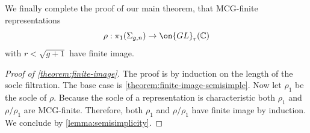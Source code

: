 \subsection{}
\label{subsection:main-proof}
We finally complete the proof of our main theorem, that
MCG-finite representations $$\rho: \pi_1(\Sigma_{g,n})\to
\on{GL}_r(\mathbb{C})$$ with $r<\sqrt{g+1}$ have finite image.
\begin{proof}[Proof of \autoref{theorem:finite-image}]
The proof is by induction on the length of the socle filtration. The base case is \autoref{theorem:finite-image-semisimple}. Now let $\rho_1$ be the socle of $\rho$.	Because the socle of a representation is characteristic both $\rho_1$
	and $\rho/\rho_1$ are
	 MCG-finite.
	Therefore, both $\rho_1$ and $\rho/\rho_1$ have finite image by induction.
	We conclude by \autoref{lemma:semisimplicity}.
\end{proof}
